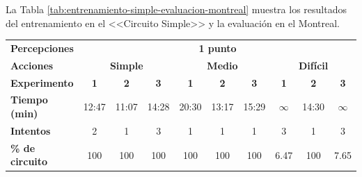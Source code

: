 La Tabla \ref{tab:entrenamiento-simple-evaluacion-montreal} muestra los resultados del entrenamiento en el <<Circuito Simple>> y la evaluación en el Montreal.

\begin{table}[ht!]
\centering
\begin{tabular}{|l|c|c|c|c|c|c|c|c|c|}
\hline
\rowcolor[HTML]{EFEFEF} 
\multicolumn{10}{|c|}{\cellcolor[HTML]{EFEFEF}\textbf{Entrenamiento en Circuito Simple y ejecución en Montreal}}                                                                                                                                        \\ \hline
\rowcolor[HTML]{EFEFEF} 
\textbf{Percepciones}                           & \multicolumn{9}{c|}{\cellcolor[HTML]{EFEFEF}\textbf{1 punto}}                                                                                                                                         \\ \hline
\rowcolor[HTML]{EFEFEF} 
\textbf{Acciones}                               & \multicolumn{3}{c|}{\cellcolor[HTML]{EFEFEF}\textbf{Simple}} & \multicolumn{3}{c|}{\cellcolor[HTML]{EFEFEF}\textbf{Medio}} & \multicolumn{3}{c|}{\cellcolor[HTML]{EFEFEF}\textbf{Difícil}}            \\ \hline
\rowcolor[HTML]{EFEFEF} 
\textbf{Experimento}                            & \textbf{1}   & \textbf{2}                      & \textbf{3}  & \textbf{1}   & \textbf{2}                     & \textbf{3}  & \textbf{1}                   & \textbf{2} & \textbf{3}                   \\ \hline
\rowcolor[HTML]{FFFFFF} 
\cellcolor[HTML]{EFEFEF}\textbf{Tiempo (min)}   & 12:47        & 11:07                           & 14:28       & 20:30        & 13:17                          & 15:29       & $\infty$                     & 14:30      & $\infty$                     \\ \hline
\rowcolor[HTML]{FFFFFF} 
\cellcolor[HTML]{EFEFEF}\textbf{Intentos}       & 2            & 1                               & 3           & 1            & 1                              & 1           & 3                            & 1          & 3                            \\ \hline
\rowcolor[HTML]{32CB00} 
\cellcolor[HTML]{EFEFEF}\textbf{\% de circuito} & 100          & 100                             & 100         & 100          & 100                            & 100         & \cellcolor[HTML]{FFC702}6.47 & 100        & \cellcolor[HTML]{FFC702}7.65 \\ \hline

\end{tabular}
\end{table}
